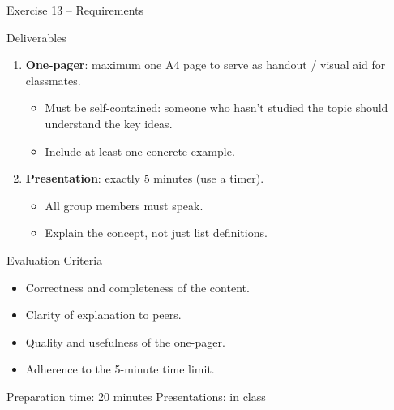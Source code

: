 \documentclass[10pt]{beamer}
\begin{document}
\begin{frame}{Exercise 13 -- Requirements}
  \begin{block}{Deliverables}
    \begin{enumerate}
      \item \textbf{One-pager}: maximum one A4 page to serve as handout / visual aid for classmates.
        \begin{itemize}
          \item Must be self-contained: someone who hasn't studied the topic should understand the key ideas.
          \item Include at least one concrete example.
        \end{itemize}
      \item \textbf{Presentation}: exactly 5 minutes (use a timer).
        \begin{itemize}
          \item All group members must speak.
          \item Explain the concept, not just list definitions.
        \end{itemize}
    \end{enumerate}
  \end{block}

  \begin{block}{Evaluation Criteria}
    \begin{itemize}
      \item Correctness and completeness of the content.
      \item Clarity of explanation to peers.
      \item Quality and usefulness of the one-pager.
      \item Adherence to the 5-minute time limit.
    \end{itemize}
  \end{block}

  \begin{alertblock}{Preparation time: 20 minutes \quad Presentations: in class}
  \end{alertblock}
\end{frame}
\end{document}
